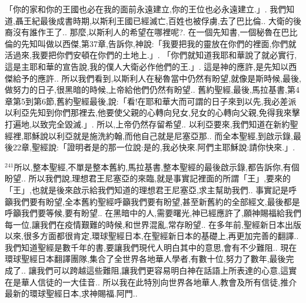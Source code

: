 \documentclass{book}
\begin{document}
「你的家和你的王國也必在我的面前永遠建立,你的王位也必永遠建立.」.
我們知道,聶王紀最後成書時期,以斯利王國已經滅亡,百姓也被俘虜,去了巴比倫..
大衛的後裔沒有誰作王了..
那麼,以斯利人的希望在哪裡呢?.
在一個先知書,一個秘魯在巴比倫的先知叫做以西傑,第37章,告訴你,神說:「我要把我的靈放在你們的裡面,你們就活過來,我要把你們安頓在你們的土地上.」.
「你們就知道我耶和華說了就必實行,這是主耶和華的宣告說,我的僕人大衛必作他們的王.」.
這是神的應許,是先知以西傑給予的應許..
所以我們看到,以斯利人在秘魯當中仍然有盼望,就像是斯時候,最後,做努力的日子,很黑暗的時候,上帝給他們仍然有盼望..
舊約聖經,最後,馬拉基書,第4章第5到第6節,舊約聖經最後,說:「看!在耶和華大而可謂的日子來到以先,我必差派以利亞先知到你們那裡去,他要使父親的心轉向兒女,兒女的心轉向父親,免得我來擊打遍地,以致完全毀滅.」.
所以,上帝仍然存留希望..
以利亞要來,我們知道在新約聖經裡,耶穌說以利亞就是施洗約翰,而他自己就是尼塞亞那..
而全本聖經,到啟示錄,最後22章,聖經說:「證明者是的那一位說:是的,我必快來.阿們主耶穌說:請你快來.」.

$^{241}$所以,整本聖經,不單是整本舊約,馬拉基書,整本聖經的最後啟示錄,都告訴你,有個盼望..
所以我們說,理想君王尼塞亞的來臨,就是事實記裡面的所謂「王」,要來的「王」,也就是後來啟示給我們知道的理想君王尼塞亞,求主幫助我們..
事實記是呼籲我們要有盼望,全本舊約聖經呼籲我們要有盼望,甚至新舊約的全部經文,最後都是呼籲我們要等候,要有盼望..
在黑暗中的人,需要曙光,神已經應許了,願神賜福給我們每一位,讓我們在疫情艱難的時候,和世界混亂,常存盼望..
在多年前,聖經新日本出版以來,很多方面都很肯定,環球聖經日本,在聖經新日本的基礎上,再更加完善的翻譯..
我們知道聖經是數千年的書,要讓我們現代人明白其中的意思,會有不少難阻..
現在環球聖經日本翻譯團隊,集合了全世界各地華人學者,有數十位,努力了數年,最後完成了..
讓我們可以跨越這些難阻,讓我們更容易明白神在話語上所表達的心意,這實在是華人信徒的一大佳音..
所以我在此特別向世界各地華人,教會及所有信徒,推介最新的環球聖經日本,求神賜福.阿門..
\newpage
\end{document}

